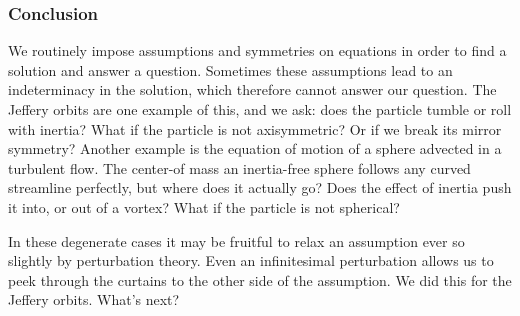 \documentclass[thesis.tex]{subfiles}
\begin{document}
\subsubsection{Conclusion}

We routinely impose assumptions and symmetries on equations in order to find a solution and answer a question. Sometimes these assumptions lead to an indeterminacy in the solution, which therefore cannot answer our question. The Jeffery orbits are one example of this, and we ask: does the particle tumble or roll with inertia? What if the particle is not axisymmetric? Or if we break its mirror symmetry? Another example is the equation of motion of a sphere advected in a turbulent flow. The center-of mass an inertia-free sphere follows any curved streamline perfectly, but where does it actually go? Does the effect of inertia push it into, or out of a vortex? What if the particle is not spherical?

In these degenerate cases it may be fruitful to relax an assumption ever so slightly by perturbation theory. Even an infinitesimal perturbation allows us to peek through the curtains to the other side of the assumption. We did this for the Jeffery orbits. What's next?

\end{document}
